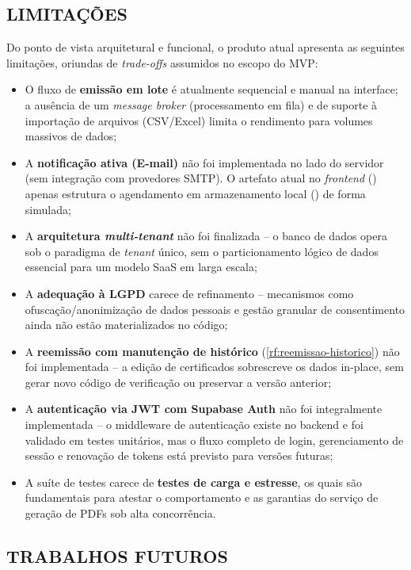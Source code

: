 \documentclass[12pt,openright,oneside,a4paper]{article}
\newcommand{\code}[1]{\texttt{\seqsplit{#1}}}
\newcounter{rf}
\begin{document}
\subsection{LIMITAÇÕES}

Do ponto de vista arquitetural e funcional, o produto atual apresenta as seguintes limitações, oriundas de \textit{trade-offs} assumidos no escopo do MVP:

\begin{itemize}
    \item O fluxo de \textbf{emissão em lote} é atualmente sequencial e manual na interface; a ausência de um \textit{message broker} (processamento em fila) e de suporte à importação de arquivos (CSV/Excel) limita o rendimento para volumes massivos de dados;
    \item A \textbf{notificação ativa (E-mail)} não foi implementada no lado do servidor (sem integração com provedores SMTP). O artefato atual no \textit{frontend} (\code{envios.ts}) apenas estrutura o agendamento em armazenamento local (\code{localStorage}) de forma simulada;
    \item A \textbf{arquitetura \textit{multi-tenant}} não foi finalizada -- o banco de dados opera sob o paradigma de \textit{tenant} único, sem o particionamento lógico de dados essencial para um modelo SaaS em larga escala;
    \item A \textbf{adequação à LGPD} carece de refinamento -- mecanismos como ofuscação/anonimização de dados pessoais e gestão granular de consentimento ainda não estão materializados no código;
    \item A \textbf{reemissão com manutenção de histórico} (\ref{rf:reemissao-historico}) não foi implementada -- a edição de certificados sobrescreve os dados in-place, sem gerar novo código de verificação ou preservar a versão anterior;
    \item A \textbf{autenticação via JWT com Supabase Auth} não foi integralmente implementada -- o middleware de autenticação existe no backend e foi validado em testes unitários, mas o fluxo completo de login, gerenciamento de sessão e renovação de tokens está previsto para versões futuras;
    \item A suíte de testes carece de \textbf{testes de carga e estresse}, os quais são fundamentais para atestar o comportamento e as garantias do serviço de geração de PDFs sob alta concorrência.
\end{itemize}

\subsection{TRABALHOS FUTUROS}
\end{document}
